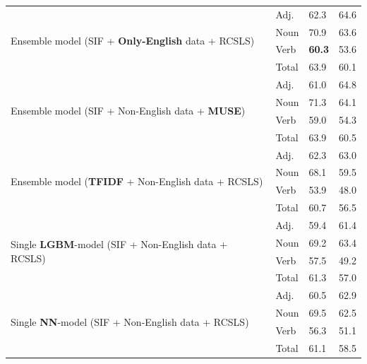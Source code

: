 \documentclass[11pt,a4paper]{article}
\begin{document}
\begin{table}[h]
\begin{tabular}{l l l l}
		\hline
		\multirow{4}{*}{Ensemble model (SIF + \textbf{Only-English} data + RCSLS)}
		& \multicolumn{1}{l}{Adj.} & \multicolumn{1}{l}{62.3} & \multicolumn{1}{l}{64.6} \\
		& \multicolumn{1}{l}{Noun} & \multicolumn{1}{l}{70.9} & \multicolumn{1}{l}{63.6} \\
		& \multicolumn{1}{l}{Verb} & \multicolumn{1}{l}{\textbf{60.3}} & \multicolumn{1}{l}{53.6} \\
		& \multicolumn{1}{l}{Total} & \multicolumn{1}{l}{63.9} & \multicolumn{1}{l}{60.1} \\
		\hline
		\multirow{4}{*}{Ensemble model (SIF + Non-English data + \textbf{MUSE})}
		& \multicolumn{1}{l}{Adj.} & \multicolumn{1}{l}{61.0} & \multicolumn{1}{l}{64.8} \\
		& \multicolumn{1}{l}{Noun} & \multicolumn{1}{l}{71.3} & \multicolumn{1}{l}{64.1} \\
		& \multicolumn{1}{l}{Verb} & \multicolumn{1}{l}{59.0} & \multicolumn{1}{l}{54.3} \\
		& \multicolumn{1}{l}{Total} & \multicolumn{1}{l}{63.9} & \multicolumn{1}{l}{60.5} \\
		\hline
		\multirow{4}{*}{Ensemble model (\textbf{TFIDF} + Non-English data + RCSLS)}
		& \multicolumn{1}{l}{Adj.} & \multicolumn{1}{l}{62.3} & \multicolumn{1}{l}{63.0} \\
		& \multicolumn{1}{l}{Noun} & \multicolumn{1}{l}{68.1} & \multicolumn{1}{l}{59.5} \\
		& \multicolumn{1}{l}{Verb} & \multicolumn{1}{l}{53.9} & \multicolumn{1}{l}{48.0} \\
		& \multicolumn{1}{l}{Total} & \multicolumn{1}{l}{60.7} & \multicolumn{1}{l}{56.5} \\
		\hline
		\multirow{4}{*}{Single \textbf{LGBM}-model (SIF + Non-English data + RCSLS)}
		& \multicolumn{1}{l}{Adj.} & \multicolumn{1}{l}{59.4} & \multicolumn{1}{l}{61.4} \\
		& \multicolumn{1}{l}{Noun} & \multicolumn{1}{l}{69.2} & \multicolumn{1}{l}{63.4} \\
		& \multicolumn{1}{l}{Verb} & \multicolumn{1}{l}{57.5} & \multicolumn{1}{l}{49.2} \\
		& \multicolumn{1}{l}{Total} & \multicolumn{1}{l}{61.3} & \multicolumn{1}{l}{57.0} \\
		
		\hline
		\multirow{4}{*}{Single \textbf{NN}-model (SIF + Non-English data + RCSLS)}
		& \multicolumn{1}{l}{Adj.} & \multicolumn{1}{l}{60.5} & \multicolumn{1}{l}{62.9} \\
		& \multicolumn{1}{l}{Noun} & \multicolumn{1}{l}{69.5} & \multicolumn{1}{l}{62.5} \\
		& \multicolumn{1}{l}{Verb} & \multicolumn{1}{l}{56.3} & \multicolumn{1}{l}{51.1} \\
		& \multicolumn{1}{l}{Total} & \multicolumn{1}{l}{61.1} & \multicolumn{1}{l}{58.5} \\
		
	\end{tabular}
	
\end{table}
\end{document}
